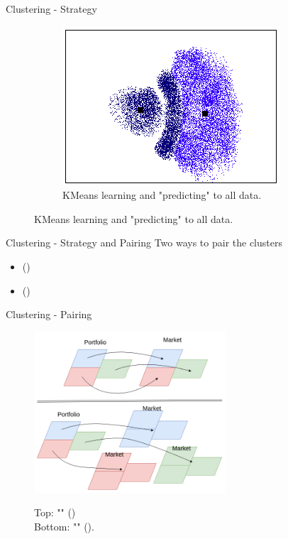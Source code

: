 
\begin{frame}{Clustering - Strategy}
    \begin{figure}
        \centering
        \caption{Example of \fullNameClusterStrategyB{}}
        \begin{subfigure}{\textwidth}
            \centering
            \includegraphics[width=0.5\linewidth]{fig/ch3-cluster-strategy-all.png}
            \caption{KMeans learning and "predicting" to all data.}
            \label{fig:sub3}
        \end{subfigure}
    \end{figure}
\end{frame}


\begin{frame}{Clustering - Strategy and Pairing} \pause
    Two ways to pair the clusters\\ \pause
    \begin{itemize}
        \item \fullNameClusterPairingA{} (\nameClusterPairingA{})
        \item \fullNameClusterPairingB{} (\nameClusterPairingB{})
    \end{itemize}
\end{frame}


\begin{frame}{Clustering - Pairing}
    \begin{figure}
        \centering
        \caption{
        Top: "\fullNameClusterPairingA{}" (\nameClusterStrategyA{}) \\
        Bottom: "\fullNameClusterPairingB{}" (\nameClusterStrategyB{}).}       \includegraphics[height=6cm]{fig/ch3-cluster-pairing.png}
        \label{fig:cluster-pairing}
    \end{figure}
\end{frame}

